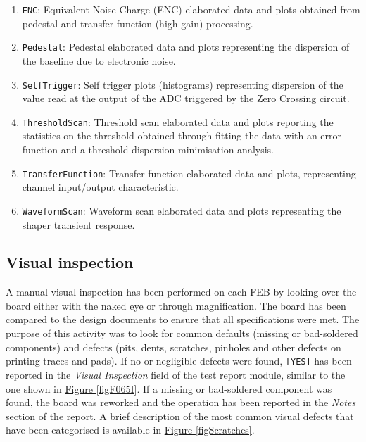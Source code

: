 \begin{enumerate}
    \itemsep0em 
    \item \texttt{ENC}: Equivalent Noise Charge (ENC) elaborated data and plots obtained from pedestal and transfer function (high gain) processing.
    \item \texttt{Pedestal}: Pedestal elaborated data and plots representing the dispersion of the baseline due to electronic noise.
    \item \texttt{SelfTrigger}: Self trigger plots (histograms) representing dispersion of the value read at the output of the ADC triggered by the Zero Crossing circuit.
    \item \texttt{ThresholdScan}: Threshold scan elaborated data and plots reporting the statistics on the threshold obtained through fitting the data with an error function and a threshold dispersion minimisation analysis.
    \item \texttt{TransferFunction}: Transfer function elaborated data and plots, representing channel input/output characteristic.
    \item \texttt{WaveformScan}: Waveform scan elaborated data and plots representing the shaper transient response.
\end{enumerate}


\subsection{Visual inspection} \label{FEBdefects}

A manual visual inspection has been performed on each FEB by looking over the board either with the naked eye or through magnification. The board has been compared to the design documents to ensure that all specifications were met. The purpose of this activity was to look for common defaults (missing or bad-soldered components) and defects (pits, dents, scratches, pinholes and other defects on printing traces and pads). If no or negligible defects were found, \texttt{[YES]} has been reported in the \textit{Visual Inspection} field of the test report module, similar to the one shown in \hyperref[figF065I]{Figure \ref{figF065I}}. If a missing or bad-soldered component was found, the board was reworked and the operation has been reported in the \textit{Notes} section of the report. A brief description of the most common visual defects that have been categorised is available in \hyperref[figScratches]{Figure \ref{figScratches}}.

